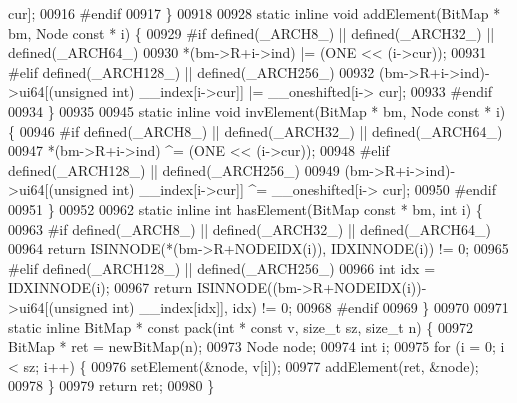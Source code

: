 \begin{DoxyCode}
      cur];
00916 \textcolor{preprocessor}{#endif}
00917 \}
00918 
00928 \textcolor{keyword}{static} \textcolor{keyword}{inline} \textcolor{keywordtype}{void} addElement(BitMap * bm, Node \textcolor{keyword}{const} * i) \{
00929 \textcolor{preprocessor}{#if defined(\_ARCH8\_) || defined(\_ARCH32\_) || defined(\_ARCH64\_)}
00930         *(bm->R+i->ind) |= (ONE << (i->cur));
00931 \textcolor{preprocessor}{#elif defined(\_ARCH128\_) || defined(\_ARCH256\_)}
00932         (bm->R+i->ind)->ui64[(\textcolor{keywordtype}{unsigned} \textcolor{keywordtype}{int}) \_\_index[i->cur]] |= \_\_oneshifted[i->
      cur];
00933 \textcolor{preprocessor}{#endif}
00934 \}
00935 
00945 \textcolor{keyword}{static} \textcolor{keyword}{inline} \textcolor{keywordtype}{void} invElement(BitMap * bm, Node \textcolor{keyword}{const} * i) \{
00946 \textcolor{preprocessor}{#if defined(\_ARCH8\_) || defined(\_ARCH32\_) || defined(\_ARCH64\_)}
00947         *(bm->R+i->ind) ^= (ONE << (i->cur));
00948 \textcolor{preprocessor}{#elif defined(\_ARCH128\_) || defined(\_ARCH256\_)}
00949         (bm->R+i->ind)->ui64[(\textcolor{keywordtype}{unsigned} \textcolor{keywordtype}{int}) \_\_index[i->cur]] ^= \_\_oneshifted[i->
      cur];
00950 \textcolor{preprocessor}{#endif}
00951 \}
00952 
00962 \textcolor{keyword}{static} \textcolor{keyword}{inline} \textcolor{keywordtype}{int} hasElement(BitMap \textcolor{keyword}{const} * bm, \textcolor{keywordtype}{int} i) \{
00963 \textcolor{preprocessor}{#if defined(\_ARCH8\_) || defined(\_ARCH32\_) || defined(\_ARCH64\_)}
00964         \textcolor{keywordflow}{return} ISINNODE(*(bm->R+NODEIDX(i)), IDXINNODE(i)) != 0;
00965 \textcolor{preprocessor}{#elif defined(\_ARCH128\_) || defined(\_ARCH256\_)}
00966         \textcolor{keywordtype}{int} idx = IDXINNODE(i);
00967         \textcolor{keywordflow}{return} ISINNODE((bm->R+NODEIDX(i))->ui64[(\textcolor{keywordtype}{unsigned} \textcolor{keywordtype}{int}) \_\_index[idx]], idx) != 0;
00968 \textcolor{preprocessor}{#endif}
00969 \}
00970 
00971 \textcolor{keyword}{static} \textcolor{keyword}{inline} BitMap * \textcolor{keyword}{const} pack(\textcolor{keywordtype}{int} * \textcolor{keyword}{const} v, \textcolor{keywordtype}{size\_t} sz, \textcolor{keywordtype}{size\_t} n) \{
00972         BitMap * ret = newBitMap(n);
00973         Node node;
00974         \textcolor{keywordtype}{int} i;
00975         \textcolor{keywordflow}{for} (i = 0; i < sz; i++) \{
00976                 setElement(&node, v[i]);
00977                 addElement(ret, &node);
00978         \}
00979         \textcolor{keywordflow}{return} ret;
00980 \}

\end{DoxyCode}
